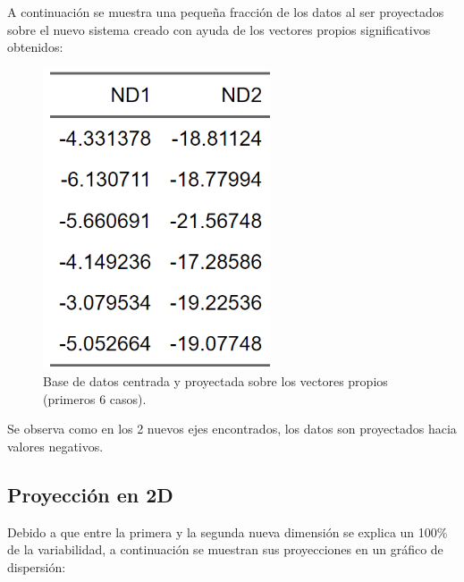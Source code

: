 \documentclass[11pt, letterpaper]{article}
\begin{document}
A continuación se muestra una pequeña fracción de los datos al ser proyectados sobre el nuevo sistema creado con ayuda de los vectores propios significativos obtenidos:

\begin{figure}[h!]
	\centering
	\begin{minipage}{0.8\textwidth}
		\centering
		\includegraphics[width=0.6\textwidth]{IMG/T3.png}
		\caption{Base de datos centrada y proyectada sobre los vectores propios (primeros 6 casos).}
		\label{fig:f6}
	\end{minipage}\hfill
\end{figure}

Se observa como en los 2 nuevos ejes encontrados, los datos son proyectados hacia valores negativos.

\newpage

\subsection{Proyección en 2D}

Debido a que entre la primera y la segunda nueva dimensión se explica un 100\% de la variabilidad, a continuación se muestran sus proyecciones en un gráfico de dispersión: 
\end{document}
